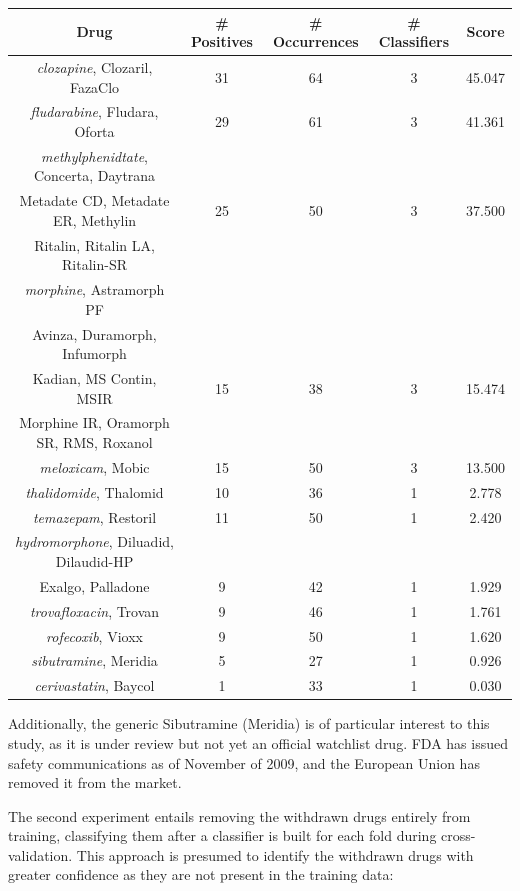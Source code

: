 \documentclass[twoside,11pt]{article}
\begin{document}
\begin{center}
  \begin{tabular}{||c c c c c||}
    \hline
    Drug & # Positives & # Occurrences & # Classifiers & Score \\
    \hline\hline
    \textit{clozapine}, Clozaril, FazaClo & 31 & 64 & 3 & 45.047\\
    \hline
    \textit{fludarabine}, Fludara, Oforta & 29 & 61 & 3 & 41.361\\
    \hline
    \textit{methylphenidtate}, Concerta, Daytrana & & & & \\
    Metadate CD, Metadate ER, Methylin & 25 & 50 & 3 & 37.500 \\
    Ritalin, Ritalin LA, Ritalin-SR & & & & \\
    \hline
    \textit{morphine}, Astramorph PF & & & & \\
    Avinza, Duramorph, Infumorph & & & & \\
    Kadian, MS Contin, MSIR & 15 & 38 & 3 & 15.474 \\
    Morphine IR, Oramorph SR, RMS, Roxanol & & & & \\
    \hline
    \textit{meloxicam}, Mobic & 15 & 50 & 3 & 13.500 \\
    \hline\hline
    \textit{thalidomide}, Thalomid & 10 & 36 & 1 & 2.778\\
    \textit{temazepam}, Restoril & 11 & 50 & 1 & 2.420\\
    \textit{hydromorphone}, Diluadid, Dilaudid-HP & & & & \\
    Exalgo, Palladone & 9 & 42 & 1 & 1.929\\
    \textit{trovafloxacin}, Trovan & 9 & 46 & 1 & 1.761\\
    \textit{rofecoxib}, Vioxx & 9 & 50 & 1 & 1.620\\
    \textit{sibutramine}, Meridia & 5 & 27 & 1 & 0.926\\
    \textit{cerivastatin}, Baycol & 1 & 33 & 1 & 0.030\\
    \hline
  \end{tabular}
\end{center}
Additionally, the generic Sibutramine (Meridia) is of particular interest to this study, as it is under review but not yet an official watchlist drug. FDA has issued safety communications as of November of 2009, and the European Union has removed it from the market.

The second experiment entails removing the withdrawn drugs entirely from training, classifying them after a classifier is built for each fold during cross-validation. This approach is presumed to identify the withdrawn drugs with greater confidence as they are not present in the training data:
\end{document}
